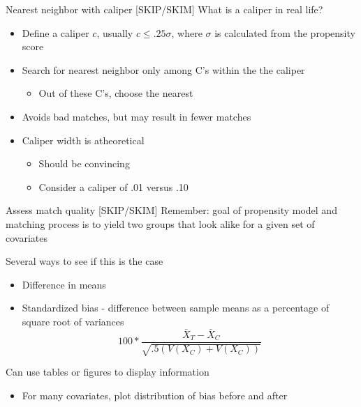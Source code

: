 \begin{frame}{Nearest neighbor with caliper [SKIP/SKIM]}
What is a caliper in real life?

\vspace{3mm}

\begin{itemize}
	\item Define a caliper $c$, usually $c \le .25\sigma$, where $\sigma$ is calculated from the propensity score  
	\item Search for nearest neighbor only among C's within the the caliper
			\begin{itemize}
				\item Out of these C's, choose the nearest
			\end{itemize}
	\item Avoids bad matches, but may result in fewer matches
	\item Caliper width is atheoretical
			\begin{itemize}
				\item Should be convincing
				\item Consider a caliper of .01 versus .10
			\end{itemize}
\end{itemize}

\end{frame}



\begin{frame}{Assess match quality  [SKIP/SKIM]}
Remember: goal of propensity model and matching process is to yield two groups that look alike for a given set of covariates 
\vspace{3mm}

Several ways to see if this is the case
\begin{itemize}
	\item Difference in means
	\item Standardized bias - difference between sample means as a percentage of square root of variances
	\[ 100*\frac{\bar{X}_T-\bar{X}_C}{\sqrt{.5(V(X_C)+V(X_C))}}  \]
\end{itemize}

\vspace{3mm}

Can use tables or figures to display information
\begin{itemize}
	\item For many covariates, plot distribution of bias before and after
\end{itemize}

\end{frame}


